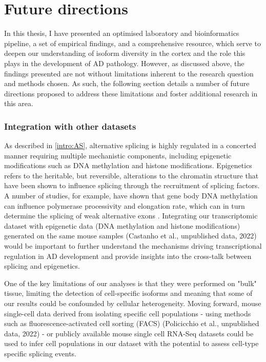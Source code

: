 \section{Future directions}
In this thesis, I have presented an optimised laboratory and bioinformatics pipeline, a set of empirical findings, and a comprehensive resource, which serve to deepen our understanding of isoform diversity in the cortex and the role this plays in the development of AD pathology. However, as discussed above, the findings presented are not without limitations inherent to the research question and methods chosen. As such, the following section details a number of future directions proposed to address these limitations and foster additional research in this area.   

\subsubsection{Integration with other datasets} 
As described in \cref{intro:AS}, alternative splicing is highly regulated in a concerted manner requiring multiple mechanistic components, including epigenetic modifications such as DNA methylation and histone modifications. Epigenetics refers to the heritable, but reversible, alterations to the chromatin structure that have been shown to influence splicing through the recruitment of splicing factors\cite{Yang2014, Shukla2011, Zhang2020a, Shukla2011, Luco2011}. A number of studies, for example, have shown that gene body DNA methylation can influence polymerase processivity and elongation rate, which can in turn determine the splicing of weak alternative exons \cite{Yang2014, Shukla2011}. Integrating our transcriptomic dataset with epigenetic data (DNA methylation and histone modifications) generated on the same mouse samples (Castanho et al., unpublished data, 2022) would be important to further understand the mechanisms driving transcriptional regulation in AD development and provide insights into the cross-talk between splicing and epigenetics. 

One of the key limitations of our analyses is that they were performed on "bulk" tissue, limiting the detection of cell-specific isoforms and meaning that some of our results could be confounded by cellular heterogeneity. Moving forward, mouse single-cell data derived from isolating specific cell populations - using methods such as fluorescence-activated cell sorting (FACS) (Policicchio  et al., unpublished data, 2022) - or publicly available mouse single cell RNA-Seq datasets could be used to infer cell populations in our dataset with the potential to assess cell-type specific splicing events.   

